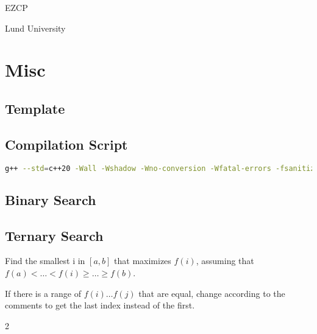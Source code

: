 \documentclass{article}
\begin{document}
\begin{titlepage}
  \centering
  \vspace*{\fill}
  {\scshape\Huge EZCP \par}
  \vspace{1cm}
  {\LARGE\color{black!75} Lund University \par}
  \vspace*{\fill}
\end{titlepage}

\section*{Misc}

\subsection*{Template}


\subsection*{Compilation Script}
\begin{lstlisting}[language=bash]
g++ --std=c++20 -Wall -Wshadow -Wno-conversion -Wfatal-errors -fsanitize=address,undefined -ftrapv -g $1 -o ${1%.cpp}.bin
\end{lstlisting}

\vspace*{-0.2cm}

\subsection*{Binary Search}


\vspace*{-0.2cm}

\subsection*{Ternary Search}
Find the smallest i in $[a,b]$ that maximizes $f(i)$, assuming that $f(a) < \dots < f(i) \ge \dots \ge f(b)$.

If there is a range of $f(i) \dots f(j)$ that are equal, change according to the comments to get the last index instead of the first.

\begin{multicols}{2}
  
  \columnbreak
  
\end{multicols}
\end{document}
